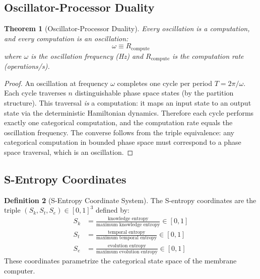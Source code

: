 \documentclass[12pt]{article}
\newtheorem{theorem}{Theorem}[section]
\theoremstyle{definition}
\newtheorem{definition}[theorem]{Definition}
\theoremstyle{remark}
\newcommand{\Sk}{S_k}
\newcommand{\St}{S_t}
\newcommand{\Se}{S_e}
\newcommand{\Rcompute}{R_{\mathrm{compute}}}
\begin{document}
\subsection{Oscillator-Processor Duality}

\begin{theorem}[Oscillator-Processor Duality]
\label{thm:duality}
Every oscillation is a computation, and every computation is an oscillation:
\begin{equation}
\label{eq:duality}
\omega \equiv \Rcompute
\end{equation}
where $\omega$ is the oscillation frequency (Hz) and $\Rcompute$ is the computation rate (operations/s).
\end{theorem}

\begin{proof}
An oscillation at frequency $\omega$ completes one cycle per period $T = 2\pi/\omega$. Each cycle traverses $n$ distinguishable phase space states (by the partition structure). This traversal \emph{is} a computation: it maps an input state to an output state via the deterministic Hamiltonian dynamics. Therefore each cycle performs exactly one categorical computation, and the computation rate equals the oscillation frequency. The converse follows from the triple equivalence: any categorical computation in bounded phase space must correspond to a phase space traversal, which is an oscillation. \qedhere
\end{proof}

\subsection{S-Entropy Coordinates}

\begin{definition}[S-Entropy Coordinate System]
\label{def:sentropy}
The S-entropy coordinates are the triple $(\Sk, \St, \Se) \in [0,1]^3$ defined by:
\begin{align}
\Sk &= \frac{\text{knowledge entropy}}{\text{maximum knowledge entropy}} \in [0,1] \label{eq:sk} \\
\St &= \frac{\text{temporal entropy}}{\text{maximum temporal entropy}} \in [0,1] \label{eq:st} \\
\Se &= \frac{\text{evolution entropy}}{\text{maximum evolution entropy}} \in [0,1] \label{eq:se}
\end{align}
These coordinates parametrize the categorical state space of the membrane computer.
\end{definition}
\end{document}
